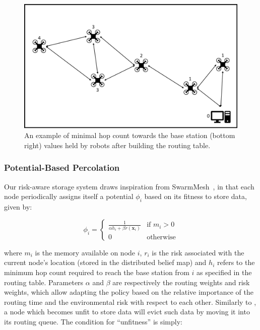 \begin{figure}[htbp]
    \centering
    \includegraphics[width=0.9\columnwidth]{figures/dora_mesh/rass-hop-count.png}
    \caption[RASS Hop Count]{An example of minimal hop count towards the base station (bottom right) values held by robots after building the routing table.}
    \label{rass_hop_count}
\end{figure}

\subsubsection{Potential-Based Percolation}
Our risk-aware storage system draws inspiration from 
SwarmMesh~\cite{majcherczykSwarmmesh2020}, in that each node periodically assigns
itself a potential $\phi_i$ based on its fitness to store data, given by:

\begin{equation}
        \phi_i =
        \left\{ 
        \begin{array}{ll}
            \frac{1}{\alpha h_i + \beta r({\bm{x}_i})} &\text{if } m_i > 0 \\
            0 &\text{otherwise}
        \end{array} \right.
        \label{equation:fitness}
\end{equation}

 where $m_i$ is the memory available on node $i$, $r_i$ is the risk
 associated with the current node's location (stored in the
 distributed belief map) and $h_i$ refers to the minimum hop count
 required to reach the base station from $i$ as specified in the
 routing table. Parameters $\alpha$ and $\beta$ are respectively the routing weights and 
 risk weights, which allow adapting the policy based on the relative importance of the 
 routing time and the environmental risk with respect to each other. Similarly to 
 \cite{majcherczykSwarmmesh2020}, a node  which becomes unfit to store data will evict such 
 data by moving it into its routing queue. The condition for ``unfitness'' is simply:

